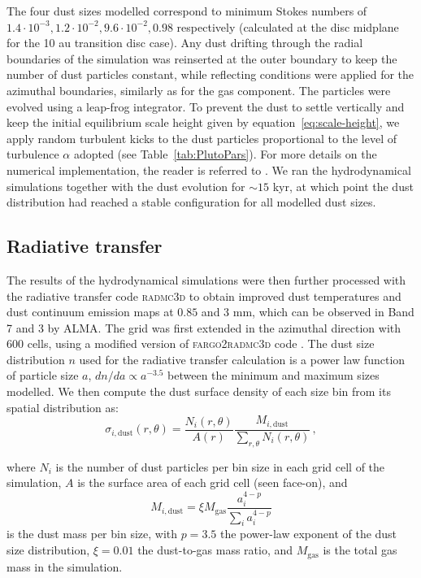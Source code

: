 \documentclass[fleqn,usenatbib]{mnras}
\begin{document}
        The four dust sizes modelled correspond to minimum Stokes numbers of $1.4\cdot10^{-3}, 1.2\cdot10^{-2}, 9.6\cdot10^{-2}, 0.98$ respectively (calculated at the disc midplane for the 10 au transition disc case).
        Any dust drifting through the radial boundaries of the simulation was reinserted at the outer boundary to keep the number of dust particles constant, while reflecting conditions were applied for the azimuthal boundaries, similarly as for the gas component.
        The particles were evolved using a leap-frog integrator.
        To prevent the dust to settle vertically and keep the initial equilibrium scale height given by equation~\ref{eq:scale-height}, we apply random turbulent kicks to the dust particles proportional to the level of turbulence $\alpha$ adopted (see Table~\ref{tab:PlutoPars}). For more details on the numerical implementation, the reader is referred to \cite{Picogna2018}. We ran the hydrodynamical simulations together with the dust evolution for $\sim15$ kyr, at which point the dust distribution had reached a stable configuration for all modelled dust sizes.
        
     \subsection{Radiative transfer} \label{sec:radiative transfer}
     
         The results of the hydrodynamical simulations were then further processed with the radiative transfer code \textsc{radmc3d} \citep{radmc3d} to obtain improved dust temperatures and dust continuum emission maps at $0.85$ and $3$ mm, which can be observed in Band 7 and 3 by ALMA. The grid was first extended in the azimuthal direction with 600 cells, using a modified version of \textsc{fargo2radmc3d} code \citep{Baruteau2019}. The dust size distribution $n$ used for the radiative transfer calculation is a power law function of particle size $a$, $dn/da \propto a^{-3.5}$ between the minimum and maximum sizes modelled. We then compute the dust surface density of each size bin from its spatial distribution as:
         \begin{equation}
            \sigma_{i,\mathrm{dust}}(r,\theta) = \frac{N_i(r,\theta)}{A(r)} \frac{M_{i,\mathrm{dust}}}{\sum_{r,\theta}N_i(r,\theta)}\,,
         \end{equation}

         where $N_i$ is the number of dust particles per bin size in each grid cell of the simulation, $A$ is the surface area of each grid cell (seen face-on), and 
         \begin{equation}
            M_{i,\mathrm{dust}} = \xi M_\mathrm{gas} \frac{a_i^{4-p}}{\sum_i a_i^{4-p}}
         \end{equation}
         is the dust mass per bin size, with $p=3.5$ the power-law exponent of the dust size distribution, $\xi=0.01$ the dust-to-gas mass ratio, and $M_\mathrm{gas}$ is the total gas mass in the simulation.
\end{document}
